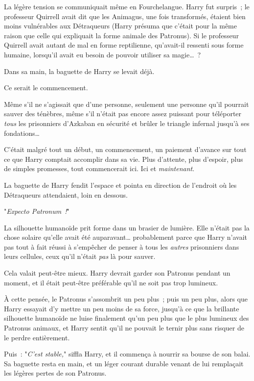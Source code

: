La légère tension se communiquait même en Fourchelangue. Harry fut surpris~; le professeur Quirrell avait dit que les Animagus, une fois transformés, étaient bien moins vulnérables aux Détraqueurs (Harry présuma que c'était pour la même raison que celle qui expliquait la forme animale des Patronus). Si le professeur Quirrell avait autant de mal en forme reptilienne, qu'avait-il ressenti sous forme humaine, lorsqu'il avait eu besoin de pouvoir utiliser sa magie…~?

Dans sa main, la baguette de Harry se levait déjà.

Ce serait le commencement.

Même s'il ne s'agissait que d'une personne, seulement une personne qu'il pourrait sauver des ténèbres, même s'il n'était pas encore assez puissant pour téléporter \emph{tous} les prisonniers d'Azkaban en sécurité et brûler le triangle infernal jusqu'à ses fondations…

C'était malgré tout un début, un commencement, un paiement d'avance sur tout ce que Harry comptait accomplir dans sa vie. Plus d'attente, plus d'espoir, plus de simples promesses, tout commencerait ici. Ici et \emph{maintenant}.

La baguette de Harry fendit l'espace et pointa en direction de l'endroit où les Détraqueurs attendaient, loin en dessous.

"\emph{Expecto Patronum~!}"

La silhouette humanoïde prit forme dans un brasier de lumière. Elle n'était pas la chose solaire qu'elle avait été auparavant… probablement parce que Harry n'avait pas tout à fait réussi à s'empêcher de penser à tous les \emph{autres} prisonniers dans leurs cellules, ceux qu'il n'était \emph{pas} là pour sauver.

Cela valait peut-être mieux. Harry devrait garder son Patronus pendant un moment, et il était peut-être préférable qu'il ne soit pas trop lumineux.

À cette pensée, le Patronus s'assombrit un peu plus~; puis un peu plus, alors que Harry essayait d'y mettre un peu moins de sa force, jusqu'à ce que la brillante silhouette humanoïde ne luise finalement qu'un peu plus que le plus lumineux des Patronus animaux, et Harry sentit qu'il ne pouvait le ternir plus sans risquer de le perdre entièrement.

Puis~: "\emph{C'est stable,}" siffla Harry, et il commença à nourrir sa bourse de son balai. Sa baguette resta en main, et un léger courant durable venant de lui remplaçait les légères pertes de son Patronus.

